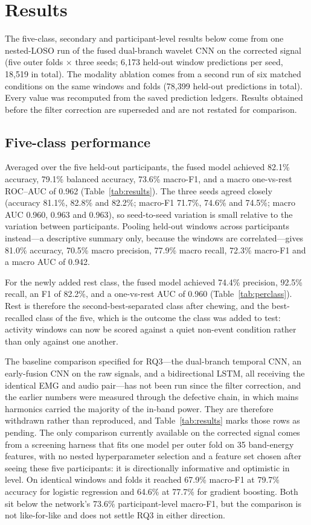 \documentclass[pdflatex,sn-nature,iicol]{sn-jnl}
\begin{document}
\section{Results}

The five-class, secondary and participant-level results below come from one nested-LOSO run of the fused dual-branch wavelet CNN on the corrected signal (five outer folds $\times$ three seeds; 6,173 held-out window predictions per seed, 18,519 in total). The modality ablation comes from a second run of six matched conditions on the same windows and folds (78,399 held-out predictions in total). Every value was recomputed from the saved prediction ledgers. Results obtained before the filter correction are superseded and are not restated for comparison.

\subsection{Five-class performance}

Averaged over the five held-out participants, the fused model achieved 82.1\% accuracy, 79.1\% balanced accuracy, 73.6\% macro-F1, and a macro one-vs-rest ROC--AUC of 0.962 (Table~\ref{tab:results}). The three seeds agreed closely (accuracy 81.1\%, 82.8\% and 82.2\%; macro-F1 71.7\%, 74.6\% and 74.5\%; macro AUC 0.960, 0.963 and 0.963), so seed-to-seed variation is small relative to the variation between participants. Pooling held-out windows across participants instead---a descriptive summary only, because the windows are correlated---gives 81.0\% accuracy, 70.5\% macro precision, 77.9\% macro recall, 72.3\% macro-F1 and a macro AUC of 0.942.

For the newly added rest class, the fused model achieved 74.4\% precision, 92.5\% recall, an F1 of 82.2\%, and a one-vs-rest AUC of 0.960 (Table~\ref{tab:perclass}). Rest is therefore the second-best-separated class after chewing, and the best-recalled class of the five, which is the outcome the class was added to test: activity windows can now be scored against a quiet non-event condition rather than only against one another.

The baseline comparison specified for RQ3---the dual-branch temporal CNN, an early-fusion CNN on the raw signals, and a bidirectional LSTM, all receiving the identical EMG and audio pair---has not been run since the filter correction, and the earlier numbers were measured through the defective chain, in which mains harmonics carried the majority of the in-band power. They are therefore withdrawn rather than reproduced, and Table~\ref{tab:results} marks those rows as pending. The only comparison currently available on the corrected signal comes from a screening harness that fits one model per outer fold on 35 band-energy features, with no nested hyperparameter selection and a feature set chosen after seeing these five participants: it is directionally informative and optimistic in level. On identical windows and folds it reached 67.9\% macro-F1 at 79.7\% accuracy for logistic regression and 64.6\% at 77.7\% for gradient boosting. Both sit below the network's 73.6\% participant-level macro-F1, but the comparison is not like-for-like and does not settle RQ3 in either direction.
\end{document}

